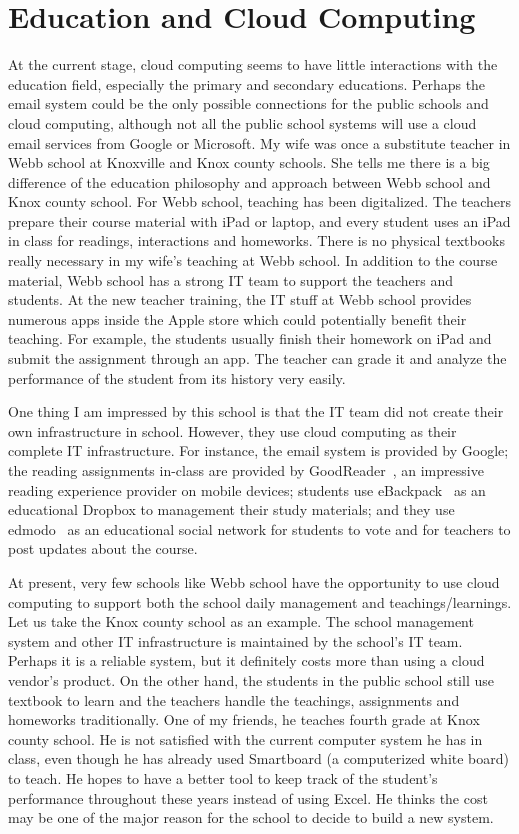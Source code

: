 \section{Education and Cloud Computing}
At the current stage, cloud computing seems to have little interactions with the education field, especially the primary and secondary educations. Perhaps the email system could be the only possible connections for the public schools and cloud computing, although not all the public school systems will use a cloud email services from Google or Microsoft. My wife was once a substitute teacher in Webb school at Knoxville and Knox county schools. She tells me there is a big difference of the education philosophy and approach between Webb school and Knox county school. For Webb school, teaching has been digitalized. The teachers prepare their course material with iPad or laptop, and every student uses an iPad in class for readings, interactions and homeworks. There is no physical textbooks really necessary in my wife's teaching at Webb school. In addition to the course material, Webb school has a strong IT team to support the teachers and students. At the new teacher training, the IT stuff at Webb school provides numerous apps inside the Apple store which could potentially benefit their teaching. For example, the students usually finish their homework on iPad and submit the assignment through an app. The teacher can grade it and analyze the performance of the student from its history very easily. 

One thing I am impressed by this school is that the IT team did not create their own infrastructure in school. However, they use cloud computing as their complete IT infrastructure. For instance, the email system is provided by Google; the reading assignments in-class are provided by GoodReader~\cite{goodreader}, an impressive reading experience provider on mobile devices; students use eBackpack~\cite{ebackpack} as an educational Dropbox to management their study materials; and they use edmodo~\cite{edmodo} as an educational social network for students to vote and for teachers to post updates about the course. 

At present, very few schools like Webb school have the opportunity to use cloud computing to support both the school daily management and teachings/learnings. Let us take the Knox county school as an example. The school management system  and other IT infrastructure is maintained by the school's IT team. Perhaps it is a reliable system, but it definitely costs more than using a cloud vendor's product. On the other hand, the students in the public school still use textbook to learn and the teachers handle the teachings, assignments and homeworks traditionally. One of my friends, he teaches fourth grade at Knox county school. He is not satisfied with the current computer system he has in class, even though he has already used Smartboard (a computerized white board) to teach. He hopes to have a better tool to keep track of the student's performance throughout these years instead of using Excel. He thinks the cost may be one of the major reason for the school to decide to build a new system.

